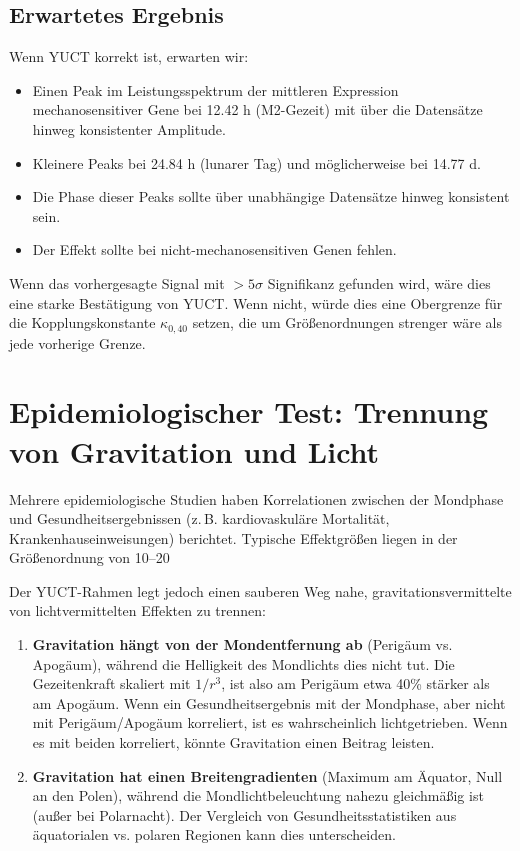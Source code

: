 \documentclass[12pt,a4paper]{article}
\theoremstyle{remark}
\begin{document}
	\subsection{Erwartetes Ergebnis}
	
	Wenn YUCT korrekt ist, erwarten wir:
	\begin{itemize}
		\item Einen Peak im Leistungsspektrum der mittleren Expression mechanosensitiver Gene bei 12.42 h (M2-Gezeit) mit über die Datensätze hinweg konsistenter Amplitude.
		\item Kleinere Peaks bei 24.84 h (lunarer Tag) und möglicherweise bei 14.77 d.
		\item Die Phase dieser Peaks sollte über unabhängige Datensätze hinweg konsistent sein.
		\item Der Effekt sollte bei nicht-mechanosensitiven Genen fehlen.
	\end{itemize}
	
	Wenn das vorhergesagte Signal mit \(> 5\sigma\) Signifikanz gefunden wird, wäre dies eine starke Bestätigung von YUCT. Wenn nicht, würde dies eine Obergrenze für die Kopplungskonstante \(\kappa_{0,40}\) setzen, die um Größenordnungen strenger wäre als jede vorherige Grenze.
	
	\section{Epidemiologischer Test: Trennung von Gravitation und Licht}
	\label{sec:epidemiology}
	
	Mehrere epidemiologische Studien haben Korrelationen zwischen der Mondphase und Gesundheitsergebnissen (z. B. kardiovaskuläre Mortalität, Krankenhauseinweisungen) berichtet. Typische Effektgrößen liegen in der Größenordnung von 10–20 %
	
	Der YUCT-Rahmen legt jedoch einen sauberen Weg nahe, gravitationsvermittelte von lichtvermittelten Effekten zu trennen:
	
	\begin{enumerate}
		\item \textbf{Gravitation hängt von der Mondentfernung ab} (Perigäum vs. Apogäum), während die Helligkeit des Mondlichts dies nicht tut. Die Gezeitenkraft skaliert mit \(1/r^3\), ist also am Perigäum etwa 40\% stärker als am Apogäum. Wenn ein Gesundheitsergebnis mit der Mondphase, aber nicht mit Perigäum/Apogäum korreliert, ist es wahrscheinlich lichtgetrieben. Wenn es mit beiden korreliert, könnte Gravitation einen Beitrag leisten.
		\item \textbf{Gravitation hat einen Breitengradienten} (Maximum am Äquator, Null an den Polen), während die Mondlichtbeleuchtung nahezu gleichmäßig ist (außer bei Polarnacht). Der Vergleich von Gesundheitsstatistiken aus äquatorialen vs. polaren Regionen kann dies unterscheiden.
	\end{enumerate}
	
\end{document}
